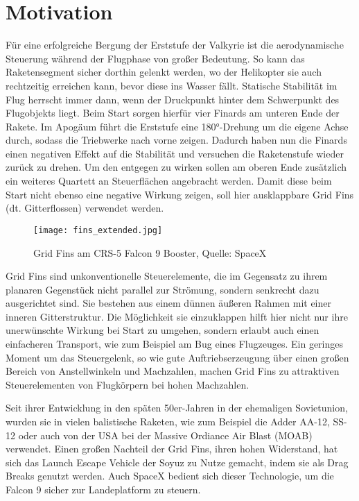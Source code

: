 \section{Motivation}
Für eine erfolgreiche Bergung der Erststufe der Valkyrie ist die aerodynamische Steuerung während der Flugphase von großer Bedeutung. So kann das Raketensegment sicher dorthin gelenkt werden, wo der Helikopter sie auch rechtzeitig erreichen kann, bevor diese ins Wasser fällt. Statische Stabilität im Flug herrscht immer dann, wenn der Druckpunkt hinter dem Schwerpunkt des Flugobjekts liegt. Beim Start sorgen hierfür vier Finards am unteren Ende der Rakete. Im Apogäum führt die Erststufe eine 180°-Drehung um die eigene Achse durch, sodass die Triebwerke nach vorne zeigen. Dadurch haben nun die Finards einen negativen Effekt auf die Stabilität und versuchen die Raketenstufe wieder zurück zu drehen. Um den entgegen zu wirken sollen am oberen Ende zusätzlich ein weiteres Quartett an Steuerflächen angebracht werden. Damit diese beim Start nicht ebenso eine negative Wirkung zeigen, soll hier ausklappbare Grid Fins (dt. Gitterflossen) verwendet werden.

\begin{figure}[h]
	\centering
	\texttt{[image: fins\_extended.jpg]}
	\caption{Grid Fins am CRS-5 Falcon 9 Booster, Quelle: SpaceX}
\end{figure}

Grid Fins sind unkonventionelle Steuerelemente, die im Gegensatz zu ihrem planaren Gegenstück nicht parallel zur Strömung, sondern senkrecht dazu ausgerichtet sind. Sie bestehen aus einem dünnen äußeren Rahmen mit einer inneren Gitterstruktur. Die Möglichkeit sie einzuklappen hilft hier nicht nur ihre unerwünschte Wirkung bei Start zu umgehen, sondern erlaubt auch einen einfacheren Transport, wie zum Beispiel am Bug eines Flugzeuges. Ein geringes Moment um das Steuergelenk, so wie gute Auftriebserzeugung über einen großen Bereich von Anstellwinkeln und Machzahlen\cite{vergleichPlanar}, machen Grid Fins zu attraktiven Steuerelementen von Flugkörpern bei hohen Machzahlen.

Seit ihrer Entwicklung in den späten 50er-Jahren in der ehemaligen Sovietunion, wurden sie in vielen balistische Raketen, wie zum Beispiel die Adder AA-12, SS-12 oder auch von der USA bei der Massive Ordiance Air Blast (MOAB) verwendet. Einen großen Nachteil der Grid Fins, ihren hohen Widerstand, hat sich das Launch Escape Vehicle der Soyuz zu Nutze gemacht, indem sie als Drag Breaks genutzt werden. Auch SpaceX bedient sich dieser Technologie, um die Falcon 9 sicher zur Landeplatform zu steuern\cite{sehnenlaenge}.

